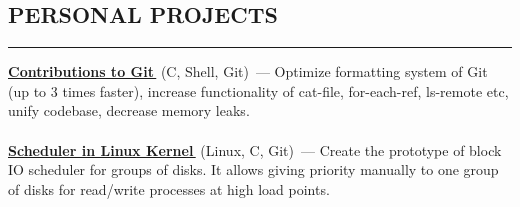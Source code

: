 \documentclass[11pt]{res} %
\let\orighref\href
\renewcommand{\href}[2]{\orighref{#1}{#2\,\faExternalLink}}
\begin{document}
 

 

\address{November 2018 \\ Saint Petersburg, Russia}

\address{\href{mailto:olyatelezhnaya@gmail.com}{olyatelezhnaya@gmail.com} \\
\href{https://github.com/telezhnaya}{github.com/telezhnaya} \\ +7 905 287 27 73}
                                             
\begin{resume}


\section{\uppercase{Personal Projects}}
\begin{spacing}{0.3}
\textcolor[RGB]{220,220,220}{\rule{\linewidth}{0.4pt}} 
\end{spacing}
\textbf{\href{https://github.com/git/git/commits?author=telezhnaya}{Contributions to Git}} (C, Shell, Git)~--- Optimize formatting system of Git (up to 3 times faster), increase functionality of cat-file, for-each-ref, ls-remote etc, unify codebase, decrease memory leaks. \\ \\
\textbf{\href{https://github.com/telezhnaya/linux}{Scheduler in Linux Kernel}} (Linux, C, Git)~--- Create the prototype of block IO scheduler for groups of disks. It allows giving priority manually to one group of disks for read/write processes at high load points.


\end{resume}
\end{document}
